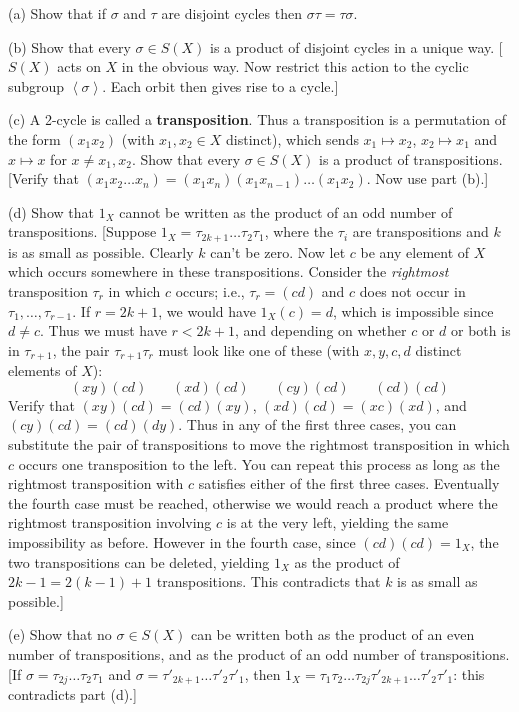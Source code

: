 \documentclass[leqno]{book}
\begin{document}
\begin{enumerate}
(a) Show that if $\sigma$ and $\tau$ are disjoint cycles then $\sigma\tau=\tau\sigma$.

(b) Show that every $\sigma\in S(X)$ is a product of disjoint cycles in a unique way.  [$S(X)$ acts on $X$ in the obvious way.  Now restrict this action to the cyclic subgroup $\left<\sigma\right>$.  Each orbit then gives rise to a cycle.]

(c) A 2-cycle is called a \textbf{transposition}.  Thus a transposition is a permutation of the form $(x_1x_2)$ (with $x_1,x_2\in X$ distinct), which sends $x_1\mapsto x_2$, $x_2\mapsto x_1$ and $x\mapsto x$ for $x\ne x_1,x_2$.  Show that every $\sigma\in S(X)$ is a product of transpositions.  [Verify that $(x_1x_2\dots x_n)=(x_1x_n)(x_1x_{n-1})\dots(x_1x_2)$.  Now use part (b).]

(d) Show that $1_X$ cannot be written as the product of an odd number of transpositions.  [Suppose $1_X=\tau_{2k+1}\dots\tau_2\tau_1$, where the $\tau_i$ are transpositions and $k$ is as small as possible.  Clearly $k$ can't be zero.  Now let $c$ be any element of $X$ which occurs somewhere in these transpositions.  Consider the \emph{rightmost} transposition $\tau_r$ in which $c$ occurs; i.e., $\tau_r=(cd)$ and $c$ does not occur in $\tau_1,\dots,\tau_{r-1}$.  If $r=2k+1$, we would have $1_X(c)=d$, which is impossible since $d\ne c$.  Thus we must have $r<2k+1$, and depending on whether $c$ or $d$ or both is in $\tau_{r+1}$, the pair $\tau_{r+1}\tau_r$ must look like one of these (with $x,y,c,d$ distinct elements of $X$):
$$(xy)(cd)~~~~~~~~(xd)(cd)~~~~~~~~(cy)(cd)~~~~~~~~(cd)(cd)$$
Verify that $(xy)(cd)=(cd)(xy)$, $(xd)(cd)=(xc)(xd)$, and $(cy)(cd)=(cd)(dy)$.  Thus in any of the first three cases, you can substitute the pair of transpositions to move the rightmost transposition in which $c$ occurs one transposition to the left.  You can repeat this process as long as the rightmost transposition with $c$ satisfies either of the first three cases.  Eventually the fourth case must be reached, otherwise we would reach a product where the rightmost transposition involving $c$ is at the very left, yielding the same impossibility as before.  However in the fourth case, since $(cd)(cd)=1_X$, the two transpositions can be deleted, yielding $1_X$ as the product of $2k-1=2(k-1)+1$ transpositions.  This contradicts that $k$ is as small as possible.]

(e) Show that no $\sigma\in S(X)$ can be written both as the product of an even number of transpositions, and as the product of an odd number of transpositions.  [If $\sigma=\tau_{2j}\dots\tau_2\tau_1$ and $\sigma=\tau'_{2k+1}\dots\tau'_2\tau'_1$, then $1_X=\tau_1\tau_2\dots\tau_{2j}\tau'_{2k+1}\dots\tau'_2\tau'_1$: this contradicts part (d).]


\end{enumerate}
\end{document}
